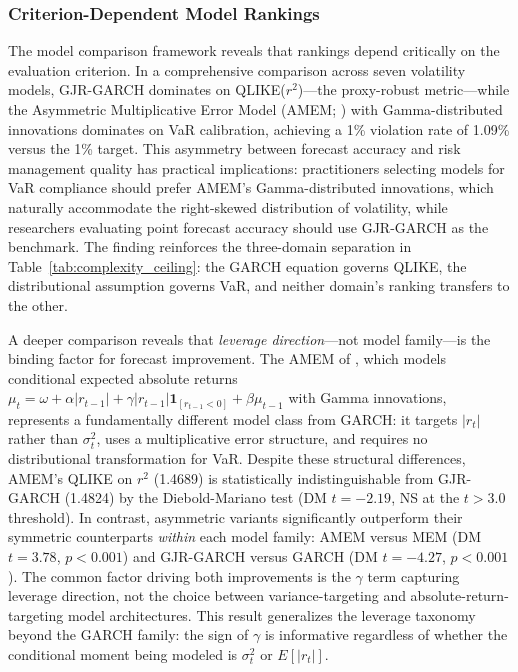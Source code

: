 \subsubsection{Criterion-Dependent Model Rankings}

The model comparison framework reveals that rankings depend critically on the evaluation criterion. In a comprehensive comparison across seven volatility models, GJR-GARCH dominates on QLIKE($r^2$)---the \citet{patton2011} proxy-robust metric---while the Asymmetric Multiplicative Error Model (AMEM; \citealt{engle2006}) with Gamma-distributed innovations dominates on VaR calibration, achieving a 1\% violation rate of 1.09\% versus the 1\% target. This asymmetry between forecast accuracy and risk management quality has practical implications: practitioners selecting models for VaR compliance should prefer AMEM's Gamma-distributed innovations, which naturally accommodate the right-skewed distribution of volatility, while researchers evaluating point forecast accuracy should use GJR-GARCH as the benchmark. The finding reinforces the three-domain separation in Table~\ref{tab:complexity_ceiling}: the GARCH equation governs QLIKE, the distributional assumption governs VaR, and neither domain's ranking transfers to the other.

A deeper comparison reveals that \textit{leverage direction}---not model family---is the binding factor for forecast improvement. The AMEM of \citet{engle2006}, which models conditional expected absolute returns $\mu_t = \omega + \alpha |r_{t-1}| + \gamma |r_{t-1}| \mathbf{1}_{[r_{t-1}<0]} + \beta \mu_{t-1}$ with Gamma innovations, represents a fundamentally different model class from GARCH: it targets $|r_t|$ rather than $\sigma^2_t$, uses a multiplicative error structure, and requires no distributional transformation for VaR. Despite these structural differences, AMEM's QLIKE on $r^2$ (1.4689) is statistically indistinguishable from GJR-GARCH (1.4824) by the Diebold-Mariano test (DM $t = -2.19$, NS at the \citealt{harvey2016} $t > 3.0$ threshold). In contrast, asymmetric variants significantly outperform their symmetric counterparts \textit{within} each model family: AMEM versus MEM (DM $t = 3.78$, $p < 0.001$) and GJR-GARCH versus GARCH (DM $t = -4.27$, $p < 0.001$). The common factor driving both improvements is the $\gamma$ term capturing leverage direction, not the choice between variance-targeting and absolute-return-targeting model architectures. This result generalizes the leverage taxonomy beyond the GARCH family: the sign of $\gamma$ is informative regardless of whether the conditional moment being modeled is $\sigma^2_t$ or $E[|r_t|]$.

